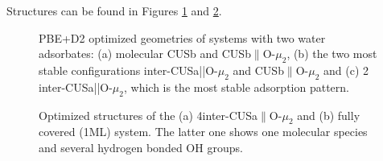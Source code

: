 \documentclass[11pt,DIV=13,BCOR=5mm,a4paper,headinclude]{scrbook}
\begin{document}
Structures can be found in Figures \ref{abb:2water} and \ref{abb:4+fully}.
\begin{figure}[!ht]
 \centering
{}
 \quad\quad
  \quad
{}
 \quad
 \caption{PBE+D2 optimized geometries of systems with two water adsorbates: (a) molecular CUSb and CUSb$\parallel$O-$\mu_2$, (b) the two most stable configurations inter-CUSa||O-$\mu_2$ and CUSb$\parallel$O-$\mu_2$ and (c) 2 inter-CUSa||O-$\mu_2$, which is the most stable adsorption pattern.}
        \label{abb:2water}
 \end{figure}
 \begin{figure}[!ht]
 \centering
{}
 \quad\quad
 \caption{Optimized structures of the (a) 4inter-CUSa$\parallel$O-$\mu_2$ and (b) fully covered (1ML) system.
The latter one shows one molecular species and several hydrogen bonded OH groups.}
        \label{abb:4+fully}
 \end{figure}
\end{document}
